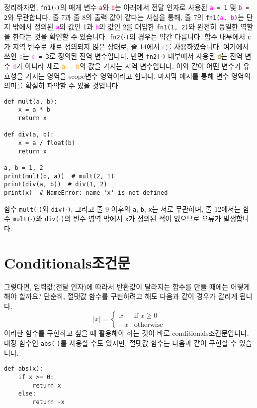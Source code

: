 \documentclass[../main.tex]{subfiles}
\begin{document}
정리하자면, \texttt{fn1($\cdot$)}의 매개 변수 \texttt{\textcolor{red}{a}}와
\texttt{\textcolor{red}{b}}는 아래에서 전달 인자로 사용된
\texttt{\textcolor{magenta}{a} = 1} 및 \texttt{\textcolor{magenta}{b} = 2}와
무관합니다.  줄 7과 줄 8의 출력 값이 같다는 사실을 통해, 줄 7의
\texttt{fn1(\textcolor{magenta}{a}, \textcolor{magenta}{b})}는 단지 밖에서
정의된 \texttt{\textcolor{magenta}{a}}의 값인 1과
\texttt{\textcolor{magenta}{b}}의 값인 2를 대입한 \texttt{fn1(1, 2)}와 완전히
동일한 역할을 한다는 것을 확인할 수 있습니다.  \texttt{fn2($\cdot$)}의 경우는
약간 다릅니다.  함수 내부에서 \texttt{c}가 지역 변수로 새로 정의되지 않은
상태로, 줄 14에서 \texttt{\textcolor{violet}{c}}를 사용하였습니다.  여기에서
쓰인 \texttt{\textcolor{violet}{c}}는 \texttt{\textcolor{violet}{c} = 3}로
정의된 전역 변수입니다.  반면 \texttt{fn2($\cdot$)} 내부에서 사용된
\texttt{\textcolor{olive}{d}}는 전역 변수 \texttt{\textcolor{violet}{d}}가
아니라 새로 \texttt{\textcolor{orange}{a} - \textcolor{orange}{b}}의 값을
가지는 지역 변수입니다.  이와 같이 어떤 변수가 유효성을 가지는 영역을 scope변수
영역이라고 합니다.  마지막 예시를 통해 변수 영역의 의미를 확실히 파악할 수 있을
것입니다.
\begin{verbatim}
def mult(a, b):
    x = a * b
    return x

def div(a, b):
    x = a / float(b)
    return x

a, b = 1, 2
print(mult(b, a))  # mult(2, 1)
print(div(a, b))  # div(1, 2)
print(x)  # NameError: name 'x' is not defined
\end{verbatim}
함수 \texttt{mult($\cdot$)}와 \texttt{div($\cdot$)}, 그리고 줄 9 이후의 \texttt{a}, \texttt{b}, \texttt{x}는 서로 무관하며, 줄 12에서는 함수 \texttt{mult($\cdot$)}와 \texttt{div($\cdot$)}의 변수 영역 밖에서 \texttt{x}가 정의된 적이 없으므로 오류가 발생합니다.

\section{Conditionals조건문}
그렇다면, 입력값(전달 인자)에 따라서 반환값이 달라지는 함수를 만들 때에는 어떻게 해야 할까요?
단순히, 절댓값 함수를 구현하려고 해도 다음과 같이 경우가 갈리게 됩니다.
$$
|x| = \begin{cases}
x & \text{if $x \geq 0$}\\
-x & \text{otherwise}
\end{cases}
$$
이러한 함수를 구현하고 싶을 때 활용해야 하는 것이 바로 conditionals조건문입니다.
내장 함수인 \texttt{abs($\cdot$)}를 사용할 수도 있지만, 절댓값 함수는 다음과
같이 구현할 수 있습니다.
\begin{verbatim}
def abs(x):
    if x >= 0:
        return x
    else:
        return -x
\end{verbatim}
\end{document}
